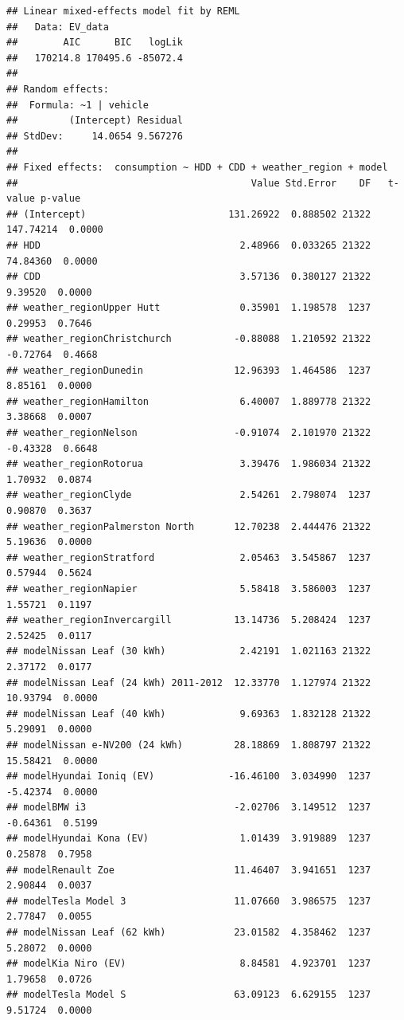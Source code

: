 \documentclass[
]{article}
\begin{document}
\begin{verbatim}
## Linear mixed-effects model fit by REML
##   Data: EV_data 
##        AIC      BIC   logLik
##   170214.8 170495.6 -85072.4
## 
## Random effects:
##  Formula: ~1 | vehicle
##         (Intercept) Residual
## StdDev:     14.0654 9.567276
## 
## Fixed effects:  consumption ~ HDD + CDD + weather_region + model 
##                                         Value Std.Error    DF   t-value p-value
## (Intercept)                         131.26922  0.888502 21322 147.74214  0.0000
## HDD                                   2.48966  0.033265 21322  74.84360  0.0000
## CDD                                   3.57136  0.380127 21322   9.39520  0.0000
## weather_regionUpper Hutt              0.35901  1.198578  1237   0.29953  0.7646
## weather_regionChristchurch           -0.88088  1.210592 21322  -0.72764  0.4668
## weather_regionDunedin                12.96393  1.464586  1237   8.85161  0.0000
## weather_regionHamilton                6.40007  1.889778 21322   3.38668  0.0007
## weather_regionNelson                 -0.91074  2.101970 21322  -0.43328  0.6648
## weather_regionRotorua                 3.39476  1.986034 21322   1.70932  0.0874
## weather_regionClyde                   2.54261  2.798074  1237   0.90870  0.3637
## weather_regionPalmerston North       12.70238  2.444476 21322   5.19636  0.0000
## weather_regionStratford               2.05463  3.545867  1237   0.57944  0.5624
## weather_regionNapier                  5.58418  3.586003  1237   1.55721  0.1197
## weather_regionInvercargill           13.14736  5.208424  1237   2.52425  0.0117
## modelNissan Leaf (30 kWh)             2.42191  1.021163 21322   2.37172  0.0177
## modelNissan Leaf (24 kWh) 2011-2012  12.33770  1.127974 21322  10.93794  0.0000
## modelNissan Leaf (40 kWh)             9.69363  1.832128 21322   5.29091  0.0000
## modelNissan e-NV200 (24 kWh)         28.18869  1.808797 21322  15.58421  0.0000
## modelHyundai Ioniq (EV)             -16.46100  3.034990  1237  -5.42374  0.0000
## modelBMW i3                          -2.02706  3.149512  1237  -0.64361  0.5199
## modelHyundai Kona (EV)                1.01439  3.919889  1237   0.25878  0.7958
## modelRenault Zoe                     11.46407  3.941651  1237   2.90844  0.0037
## modelTesla Model 3                   11.07660  3.986575  1237   2.77847  0.0055
## modelNissan Leaf (62 kWh)            23.01582  4.358462  1237   5.28072  0.0000
## modelKia Niro (EV)                    8.84581  4.923701  1237   1.79658  0.0726
## modelTesla Model S                   63.09123  6.629155  1237   9.51724  0.0000

\end{verbatim}
\end{document}
